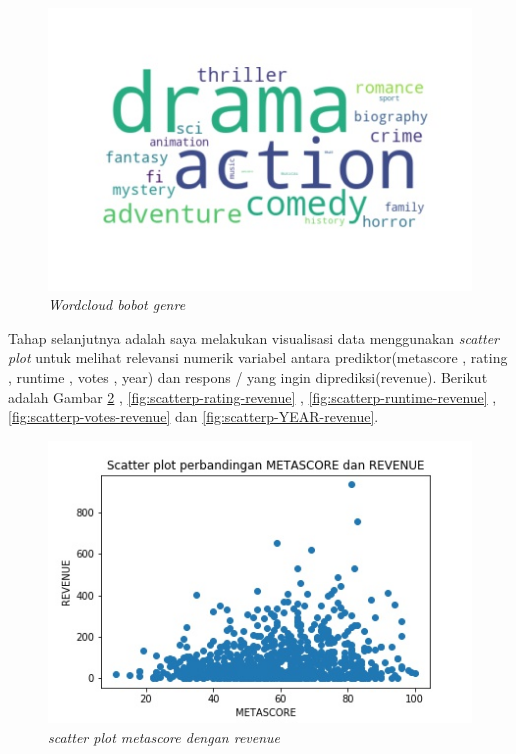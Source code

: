 \documentclass[a4paper,twoside]{article}
\begin{document}
\begin{enumerate}
\begin{figure}[h!]
		\centering  
		\includegraphics[scale=0.7]{wordcloud-genre}   
		\caption{\textit{Wordcloud bobot genre}}
		\label{fig:wordcloudgenre} 
\end{figure}

Tahap selanjutnya adalah saya melakukan visualisasi data menggunakan \textit{scatter plot} untuk melihat relevansi numerik variabel antara prediktor(metascore , rating , runtime , votes , year) dan respons  / yang ingin diprediksi(revenue). Berikut adalah Gambar \ref{fig:scatterp-metascore-revenue} , \ref{fig:scatterp-rating-revenue} , \ref{fig:scatterp-runtime-revenue} , \ref{fig:scatterp-votes-revenue}  dan \ref{fig:scatterp-YEAR-revenue}.

   
 \begin{figure}[h!]
		\centering  
		\includegraphics[scale=0.7]{scatterp-METASCORE-REVENUE}   
		\caption{\textit{scatter plot metascore dengan revenue}}
		\label{fig:scatterp-metascore-revenue} 
\end{figure}

\pagebreak


\end{enumerate}
\end{document}
